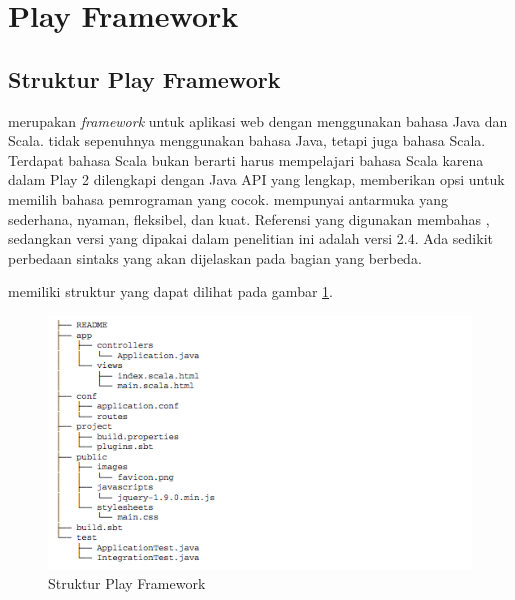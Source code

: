 \section{Play Framework}
\label{sec:play}
\subsection{Struktur Play Framework}
\play \cite{playforjava} merupakan \textit{framework} untuk aplikasi web dengan menggunakan bahasa Java dan Scala. \play tidak sepenuhnya menggunakan bahasa Java, tetapi juga bahasa Scala. Terdapat bahasa Scala bukan berarti harus mempelajari bahasa Scala karena dalam Play 2 dilengkapi dengan Java API yang lengkap, memberikan opsi untuk memilih bahasa pemrograman yang cocok. \play mempunyai antarmuka yang sederhana, nyaman, fleksibel, dan kuat. Referensi \cite{playforjava} yang digunakan membahas , sedangkan versi \play yang dipakai dalam penelitian ini adalah versi 2.4. Ada sedikit perbedaan sintaks yang akan dijelaskan pada bagian yang berbeda.
%

\play memiliki struktur yang dapat dilihat pada gambar \ref{fig:2_play_struktur}.

\begin{figure}[H]
	\centering
	\includegraphics[scale=0.7]{Gambar/play-struktur}
	\caption{Struktur Play Framework \cite{playforjava}} 
	\label{fig:2_play_struktur}
\end{figure}

